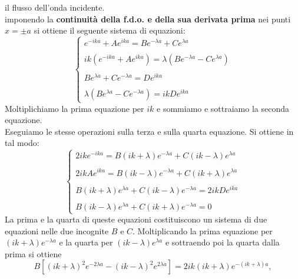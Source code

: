 \documentclass[a4paper,11pt,oneside]{book}
\begin{document}
il flusso dell'onda incidente.\\
imponendo la \textbf{continuità della f.d.o. e della sua derivata prima} nei punti $x=\pm a$ si ottiene il seguente sistema di equazioni:
\begin{equation}
\begin{cases}
\displaystyle{e^{-ika}+ Ae^{ika}= Be^{-\lambda a} + C e^{\lambda a}}\\
\\
\displaystyle{ik \left(e^{-ika}+ Ae^{ika}\right)= \lambda \left(Be^{-\lambda a} - C e^{\lambda a}\right)}\\
\\
\displaystyle{Be^{\lambda a} + Ce^{-\lambda a}= De^{ika}}\\
\\
\displaystyle{\lambda \left(Be^{\lambda a} -Ce^{-\lambda a} \right)= ikDe^{ika}}
\end{cases}
\end{equation}
Moltiplichiamo la prima equazione per $ik$ e sommiamo e sottraiamo la seconda equazione.\\
Eseguiamo le stesse operazioni sulla terza e sulla quarta equazione. Si ottiene in tal modo:
\begin{equation}
\begin{cases}
\displaystyle{2ike^{-ika}= B \left(ik+\lambda\right)e^{-\lambda a} +C \left(ik-\lambda\right)e^{\lambda a} }\\
\\
\displaystyle{2ikAe^{ika}= B \left(ik-\lambda\right)e^{-\lambda a} +C \left(ik+\lambda\right)e^{\lambda a} }\\
\\
\displaystyle{B\left(ik+\lambda\right)e^{\lambda a} + C\left(ik-\lambda\right)e^{-\lambda a} = 2ikD e^{ika}}\\
\\
\displaystyle{B\left(ik-\lambda\right)e^{\lambda a} + C\left(ik+\lambda\right)e^{-\lambda a} =0}
\end{cases}
\label{eq:cap10_10}
\end{equation}
La prima e la quarta di queste equazioni costituiscono un sistema di due equazioni nelle due incognite $B$ e $C$. Moltiplicando la prima equazione per $(ik+\lambda) e^{-\lambda a }$ e la quarta per $(ik-\lambda) e^{\lambda a }$ e sottraendo poi la quarta dalla prima si ottiene
\begin{equation}
B\left[ (ik+\lambda)^2 e^{-2\lambda a }-(ik-\lambda)^2 e^{2\lambda a }\right]= 2ik(ik+\lambda) e^{-\left(ik+\lambda\right) a },
\end{equation} 
\end{document}
